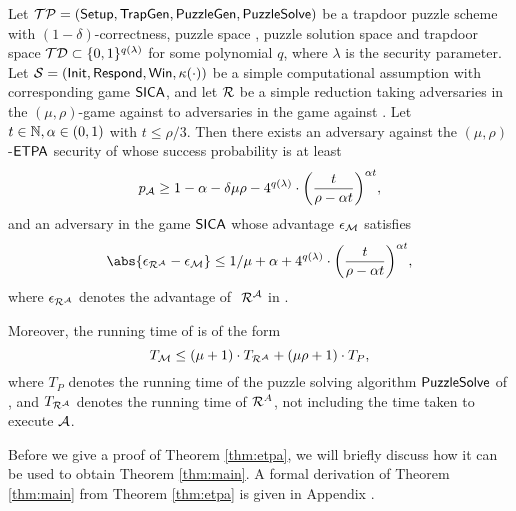\begin{theorem}\label{thm:etpa}
  Let \(\mathcal{TP} = (\mathsf{Setup},\allowbreak \mathsf{TrapGen},\allowbreak \mathsf{PuzzleGen},\allowbreak \mathsf{PuzzleSolve})\)
  be a trapdoor puzzle scheme with \((1-\delta)\)-correctness,
  puzzle space \PZ, puzzle solution space \SO
  and trapdoor space \(\mathcal{TD} \subset \{0,1\}^{q(\lambda)}\) for some polynomial \(q\),
  where \(\lambda\) is the security parameter.
  Let \(\mathcal{S} = (\mathsf{Init},\allowbreak \mathsf{Respond},\allowbreak \mathsf{Win},\allowbreak \kappa(\cdot))\)
  be a simple computational assumption
  with corresponding game \(\mathsf{SICA}\),
  and let \(\redR\) be a simple reduction
  taking adversaries in the \((\mu,\rho)\)-\ETPA game against \TP to
  adversaries in the \SICA game against \Simple.
  Let \(t \in \mathbb{N}, \alpha \in (0,1)\) with \(t \le \rho/3\).
  Then there exists an adversary \advA
  against the \((\mu,\rho)\)-\(\mathsf{ETPA}\) security of \TP
  whose success probability is at least
  \begin{equation}\label{ineq:A}
    p_{\advA} \ge 1 - \alpha - \delta \mu \rho
    - 4^{q(\lambda)} \cdot \left( \frac{t}{\rho - \alpha t} \right)^{\alpha t},
  \end{equation}
  and an adversary \redM in the game \(\mathsf{SICA}\) whose advantage \(\epsilon_{\mathcal{M}}\) satisfies
  \begin{equation}\label{ineq:M}
    \abs{\epsilon_{\redR^{\advA}} - \epsilon_{\redM}} \le 1/\mu + \alpha
    + 4^{q(\lambda)} \cdot \left( \frac{t}{\rho - \alpha t} \right)^{\alpha t},
  \end{equation}
  where \(\epsilon_{\redR^{\advA}}\) denotes the advantage of \(\text{ }\redR^{\advA}\) in \SICA.

  Moreover, the running time of \redM is of the form
  \begin{equation}\label{ineq:M:time}
    T_{\redM} \le (\mu + 1) \cdot T_{\redR^{\advA}} + (\mu \rho + 1) \cdot T_{P},
  \end{equation}
  where \(T_{P}\) denotes the running time of the puzzle solving algorithm
  \(\mathsf{PuzzleSolve}\) of \TP, and \(T_{\redR^{\advA}}\) denotes the running time of \(\redR^{A}\),
  not including the time taken to execute \(\mathcal{A}\).
\end{theorem}

Before we give a proof of Theorem \ref{thm:etpa},
we will briefly discuss how it can be used to obtain Theorem \ref{thm:main}.
A formal derivation of Theorem \ref{thm:main} from Theorem \ref{thm:etpa}
is given in Appendix .


